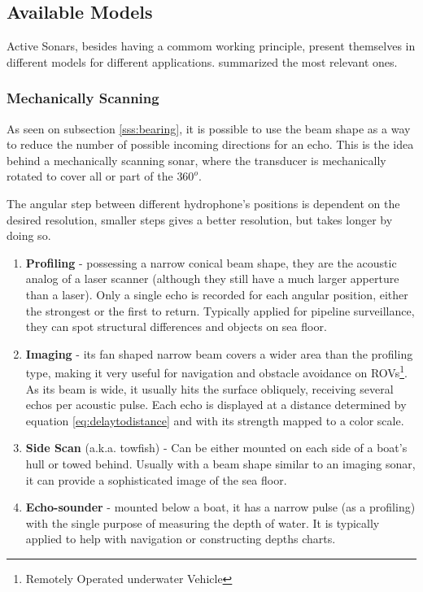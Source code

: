 \subsection{Available Models}
\label{ss:avaible_models}
 
Active Sonars, besides having a commom working principle, present themselves in
different models for different applications. \citet{sonars:16} summarized the
most relevant ones.

\subsubsection{Mechanically Scanning}

As seen on subsection \ref{sss:bearing}, it is possible to use the beam shape as
a way to reduce the number of possible incoming directions for an echo. This is
the idea behind a mechanically scanning sonar, where the transducer is
mechanically rotated to cover all or part of the $360^o$.

The angular step between different hydrophone's positions is dependent on the
desired resolution, smaller steps gives a better resolution, but takes longer
by doing so.

\begin{enumerate}
  \item \textbf{Profiling} - possessing a narrow conical beam shape, they are the
  acoustic analog of a laser scanner (although they still have a much larger
  apperture than a laser). Only a single echo is recorded for each angular
  position, either the strongest or the first to return. Typically applied for
  pipeline surveillance, they can spot structural differences and objects on
  sea floor.
  \item \textbf{Imaging} - its fan shaped narrow beam covers a wider area than
  the profiling type, making it very useful for navigation and obstacle
  avoidance on ROVs\footnote{Remotely Operated underwater Vehicle}. As its beam
  is wide, it usually hits the surface obliquely, receiving several echos per
  acoustic pulse. Each echo is displayed at a distance determined by equation
  \ref{eq:delaytodistance} and with its strength mapped to a color scale.
  \item \textbf{Side Scan} (a.k.a. towfish) - Can be either mounted on each side
  of a boat's hull or towed behind. Usually with a beam shape similar to an
  imaging sonar, it can provide a sophisticated image of the sea floor.
  \item \textbf{Echo-sounder} - mounted below a boat, it has a narrow pulse
  (as a profiling) with the single purpose of measuring the depth of water. It
  is typically applied to help with navigation or constructing depths charts.
\end{enumerate}

